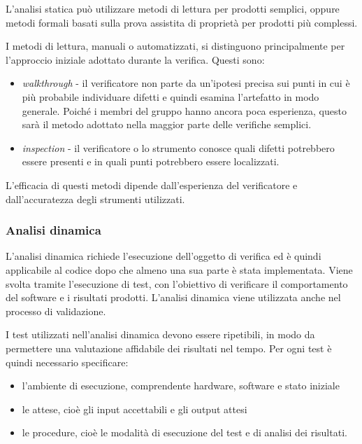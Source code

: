 \documentclass[12pt, a4paper]{article}
\begin{document}
L'analisi statica può utilizzare metodi di lettura per prodotti semplici, oppure metodi formali basati sulla prova assistita di proprietà per prodotti più complessi.

I metodi di lettura, manuali o automatizzati, si distinguono principalmente per l'approccio iniziale adottato durante la verifica. Questi sono:

\begin{itemize}
    \item \textit{walkthrough} - il verificatore non parte da un'ipotesi precisa sui punti in cui è più probabile individuare difetti e quindi esamina l'artefatto in modo generale. Poiché i membri del gruppo hanno ancora poca esperienza, questo sarà il metodo adottato nella maggior parte delle verifiche semplici.

    \item \textit{inspection} - il verificatore o lo strumento conosce quali difetti potrebbero essere presenti e in quali punti potrebbero essere localizzati.
\end{itemize}

L'efficacia di questi metodi dipende dall'esperienza del verificatore e dall'accuratezza degli strumenti utilizzati.


\subsubsection{Analisi dinamica}

L'analisi dinamica richiede l'esecuzione dell'oggetto di verifica ed è quindi applicabile al codice dopo che almeno una sua parte è stata implementata. Viene svolta tramite l'esecuzione di test, con l'obiettivo di verificare il comportamento del software e i risultati prodotti. L'analisi dinamica viene utilizzata anche nel processo di validazione.

I test utilizzati nell'analisi dinamica devono essere ripetibili, in modo da permettere una valutazione affidabile dei risultati nel tempo. Per ogni test è quindi necessario specificare:

\begin{itemize}
    \item l'ambiente di esecuzione, comprendente hardware, software e stato iniziale
    \item le attese, cioè gli input accettabili e gli output attesi
    \item le procedure, cioè le modalità di esecuzione del test e di analisi dei risultati.
\end{itemize}
\end{document}
